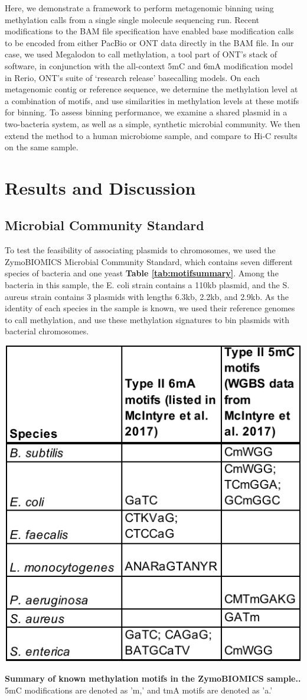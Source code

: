 Here, we demonstrate a framework to perform metagenomic binning using methylation calls from a single single molecule sequencing run. Recent modifications to the BAM file specification have enabled base modification calls to be encoded from either PacBio or ONT data directly in the BAM file.  In our case, we used Megalodon to call methylation, a tool part of ONT’s stack of software, in conjunction with the all-context 5mC and 6mA modification model in Rerio, ONT’s suite of ‘research release’ basecalling models. On each metagenomic contig or reference sequence, we determine the methylation level at a combination of motifs, and use similarities in methylation levels at these motifs for binning. To assess binning performance, we examine a shared plasmid in a two-bacteria system, as well as a simple, synthetic microbial community. We then extend the method to a human microbiome sample, and compare to Hi-C results on the same sample.


\section{Results and Discussion}
\label{sec:results}

\subsection{Microbial Community Standard}
\label{sec:zymo}

To test the feasibility of associating plasmids to chromosomes, we used the ZymoBIOMICS Microbial Community Standard, which contains seven different species of bacteria and one yeast {\bf Table \ref{tab:motifsummary}}. Among the bacteria in this sample, the E. coli strain contains a 110kb plasmid, and the S. aureus strain contains 3 plasmids with lengths 6.3kb, 2.2kb, and 2.9kb. As the identity of each species in the sample is known, we used their reference genomes to call methylation, and use these methylation signatures to bin plasmids with bacterial chromosomes.




\begin{table}[!hb]
\centering
\includegraphics[width = .5\linewidth,keepaspectratio]{figure/motifsummary.pdf}
\caption[Summary of known methylation motifs in the ZymoBIOMICS sample.]{{\bf Summary of known methylation motifs in the ZymoBIOMICS sample..} 5mC modifications are denoted as 'm,' and tmA motifs are denoted as 'a.' }
\label{tab:motifsummary}
\end{table}



